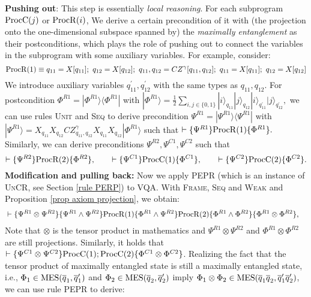 \documentclass[conference,compsoc, 10pt]{IEEEtran}
\newcommand {\qbar} {{\overline{q}}}
\def\>{\ensuremath{\rangle}}
\def\<{\ensuremath{\langle}}
\begin{document}
\begin{appendices}
		\vspace{0.15cm}
		
		\noindent\textbf {Pushing out}: This step is essentially \textit{local reasoning}. For each subprogram ${\rm ProcC}(j)$ or ${\rm ProcR}(i)$, We derive a certain precondition of it with (the projection onto the one-dimensional subspace spanned by) the \emph{maximally entanglement} as their postconditions, which plays the role of pushing out to connect the variables in the subprogram with some auxiliary variables. For example, consider: $${\rm ProcR}(1)\equiv q_{11} = X[q_{11}];\ q_{12} = X[q_{12}];\ q_{11},q_{12} = CZ^\gamma[q_{11},q_{12}];\ q_{11} = X[q_{11}];\ q_{12} = X[q_{12}]$$
		We introduce auxiliary variables $q_{11}^\prime,q_{12}^\prime$ with the same types as $q_{11},q_{12}$. For postcondition $\Phi^{R1} = |\Phi^{R1}\>\<\Phi^{R1}|$ with 
		$|\Phi^{R1}\> = \frac{1}{2}\sum_{i,j\in\{0,1\}}|i\>_{q_{11}}|j\>_{q_{12}}|i\>_{q_{11}^\prime}|j\>_{q_{12}^\prime},$ 
		we can use rules \textsc{Unit} and \textsc{Seq} to derive precondition $\Psi^{R1} = |\Psi^{R1}\>\<\Psi^{R1}|$ with 
		$|\Psi^{R1}\> = X_{q_{11}}X_{q_{12}}CZ^\gamma_{q_{11},q_{12}}X_{q_{11}}X_{q_{12}}|\Phi^{R1}\>$
		such that $\vdash\{\Psi^{R1}\}{\rm ProcR}(1)\{\Phi^{R1}\}.$ Similarly, we can derive preconditions $\Psi^{R2}, \Psi^{C1}, \Psi^{C2}$ such that  $$\vdash\{\Psi^{R2}\}{\rm ProcR}(2)\{\Phi^{R2}\},\qquad \vdash\{\Psi^{C1}\}{\rm ProcC}(1)\{\Phi^{C1}\},\qquad \vdash\{\Psi^{C2}\}{\rm ProcC}(2)\{\Phi^{C2}\}.$$ 	
		\noindent\textbf {Modification and pulling back: } 
		Now we apply \textsc{PEPR} (which is an instance of \textsc{UnCR}, see Section \ref{rule PERP}) to VQA. With \textsc{Frame}, \textsc{Seq} and \textsc{Weak} and Proposition \ref{prop axiom projection}, we obtain:
		\begin{align*}
		&\vdash\{\Psi^{R1}\otimes\Psi^{R2}\}\{\Psi^{R1}\wedge\Psi^{R2}\}{\rm ProcR}(1)\{\Phi^{R1}\wedge\Psi^{R2}\}{\rm ProcR}(2)\{\Phi^{R1}\wedge\Phi^{R2}\}\{\Phi^{R1}\otimes\Phi^{R2}\},
		\end{align*}
		Note that $\otimes$ is the tensor product in mathematics and $\Psi^{R1}\otimes\Psi^{R2}$ and $\Phi^{R1}\otimes\Phi^{R2}$ are still projections.
		Similarly, it holds that $\vdash\{\Psi^{C1}\otimes\Psi^{C2}\}{\rm ProcC}(1);{\rm ProcC}(2)\{\Phi^{C1}\otimes\Phi^{C2}\}$.
		Realizing the fact that the tensor product of maximally entangled state is still a maximally entangled state, i.e., $\Phi_1\in{\rm MES}(\qbar_1,\qbar_1^\prime)$ and $\Phi_2\in{\rm MES}(\qbar_2,\qbar_2^\prime)$ imply $\Phi_1\otimes\Phi_2\in{\rm MES}(\qbar_1\qbar_2,\qbar_1^\prime\qbar_2^\prime)$, we can use rule \textsc{PEPR} to derive:

\end{appendices}
\end{document}
